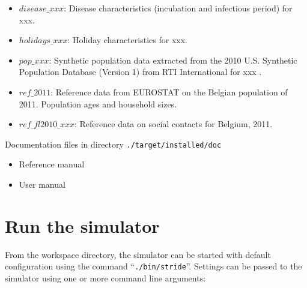 \begin{compactitem}
\begin{itemize}
		\item $disease\_xxx$: Disease characteristics (incubation and infectious period) for xxx.
		\item $holidays\_xxx$: Holiday characteristics for xxx.
		\item $pop\_xxx$: Synthetic population data extracted from the 2010 U.S. Synthetic Population Database (Version 1) from RTI International for xxx \cite{wheaton2014a,wheaton2014b}. 
		\item $ref\_2011$: Reference data from EUROSTAT on the Belgian population of 2011. Population ages and household sizes.
		\item $ref\_fl2010\_xxx$: Reference data on social contacts for Belgium, 2011. 

		
        \end{itemize}
    \item Documentation files
      	in directory \texttt{./target/installed/doc}
      	\begin{itemize}
        		\item Reference manual
        		\item User manual
        \end{itemize}
\end{compactitem}



\section{Run the simulator}


From the workspace directory, the simulator can be started with default configuration using the command \mbox{``\texttt{./bin/stride}''}. Settings can be passed to the simulator using one or more command line arguments:

